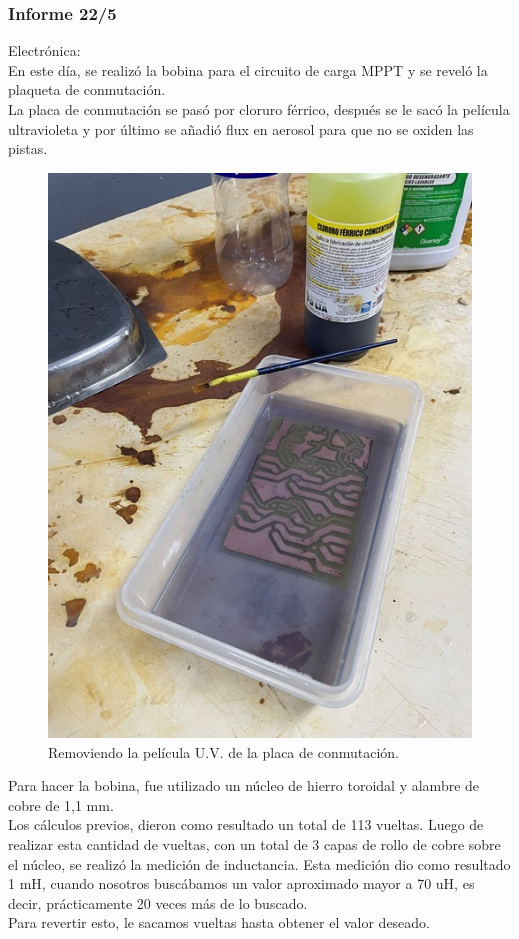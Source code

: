 \subsubsection{Informe 22/5}

Electrónica:\\

En este día, se realizó la bobina para el circuito de carga MPPT y se reveló la plaqueta de conmutación. \\

La placa de conmutación se pasó por cloruro férrico, después se le sacó la película ultravioleta y por último se añadió flux en aerosol para que no se oxiden las pistas.\\

\begin{figure}[H]
    \centering
    \includegraphics[width=0.5\linewidth]{informes/IMG_8158.jpg}
    \caption{Removiendo la película U.V. de la placa de conmutación.}
\end{figure}

Para hacer la bobina, fue utilizado un núcleo de hierro toroidal y alambre de cobre de 1,1 mm. \\

Los cálculos previos, dieron como resultado un total de 113 vueltas. Luego de realizar esta cantidad de vueltas, con un total de 3 capas de rollo de cobre sobre el núcleo, se realizó la medición de inductancia. Esta medición dio como resultado 1 mH, cuando nosotros buscábamos un valor aproximado mayor a 70 uH, es decir, prácticamente 20 veces más de lo buscado. \\

Para revertir esto, le sacamos vueltas hasta obtener el valor deseado.\\

